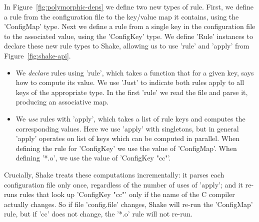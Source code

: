 In Figure~\ref{fig:polymorphic-deps} we define two new types of rule. First, we
define a rule from the configuration file to the key/value map it contains, using the
\lst'ConfigMap' type. Next we define a rule from a single key in the configuration file to the associated value,
using the \lst'ConfigKey' type. We define \lst'Rule' instances to declare these
new rule types to Shake, allowing us to use \lst'rule' and \lst'apply' from
Figure~\ref{fig:shake-api}.

\begin{itemize}
\item We \emph{declare} rules using \lst'rule', which takes a function that for a given key,
says how to compute its value. We use \lst'Just' to indicate both rules apply to all
keys of the appropriate type. In the first \lst'rule' we read the file and parse it,
producing an associative map.
\item We \emph{use} rules with \lst'apply', which takes a list of rule keys and computes the
corresponding values. Here we use \lst'apply' with singletons, but in general \lst'apply'
operates on list of keys which can be computed in parallel. When defining the rule
for \lst'ConfigKey' we use the value of \lst'ConfigMap'. When defining \lst'*.o',
we use the value of \lst'ConfigKey "cc"'.
\end{itemize}

Crucially, Shake treats these computations incrementally: it parses each
configuration file only once, regardless of the number of uses of \lst'apply'; and
it re-runs rules that look up \lst'ConfigKey "cc"' only if the
name of the C compiler actually changes.  So if file \lst'config.file' changes,
Shake will re-run the \lst'ConfigMap' rule, but if \lst'cc' does
not change, the \lst'*.o' rule will not re-run.

%


